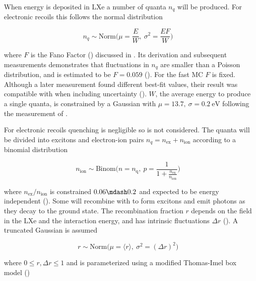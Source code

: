 When energy is deposited in LXe a number of quanta $n_q$ will be produced.  For electronic recoils this follows the normal distribution

\begin{equation}
n_q \sim \mathrm{Norm} \bigg( \mu = \frac{E}{W},\ \sigma^2 = \frac{E F}{W} \bigg)
\label{eq:er_nr_calibrations_parameter_determ_er_quanta}
\end{equation}

\noindent where $F$ is the Fano Factor () discussed in .  Its derivation and subsequent measurements
demonstrates that fluctuations in $n_q$ are smaller than a Poisson distribution, and is estimated to be $F = 0.059$
().  For the
fast MC $F$ is fixed.  Although a later measurement found different best-fit values, their result was
compatible with  when including uncertainty ().  $W$, the average energy to produce a single
quanta, is constrained by a Gaussian with $\mu = 13.7,\ \sigma = 0.2\ \mathrm{eV}$ following the measurement of .

For electronic recoils quenching is negligible so is not considered.  The quanta will be divided into excitons and electron-ion pairs
$n_q = n_{\mathrm{ex}} + n_{\mathrm{ion}}$ according to a binomial distribution

\begin{equation}
n_{\mathrm{ion}} \sim \mathrm{Binom} \Bigg(n = n_{\mathrm{q}},\ p = \frac{1}{1 + \frac{n_{\mathrm{ex}}}{n_{\mathrm{ion}}}} \Bigg)
\label{eq:er_nr_calibrations_parameter_determ_er_nions}
\end{equation}

\noindent where $n_{\mathrm{ex}} / n_{\mathrm{ion}}$ is constrained $0.06 \mdash 0.2$ and expected to be energy independent
().  Some \electron will recombine with  to form
excitons and emit photons as they decay to the ground state.  The recombination fraction $r$ depends on the field in the LXe and the
interaction energy, and has intrinsic fluctuations $\Delta r$ ().  A truncated Gaussian is assumed

\begin{equation}
r \sim \mathrm{Norm} \Big( \mu = \langle r \rangle,\ \sigma^2 = (\Delta r)^2 \Big)
\end{equation}

\noindent where $0 \leq r, \Delta r \leq 1$ and is parameterized using a modified Thomas-Imel box model ()

